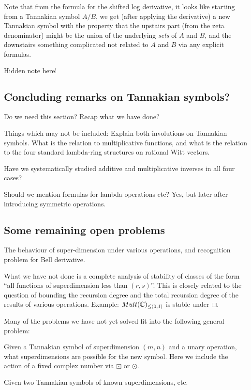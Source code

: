 Note that from the formula for the shifted log derivative, it looks like starting from a Tannakian symbol $A/B$, we get (after applying the derivative) a new Tannakian symbol with the property that the upstairs part (from the zeta denominator) might be the union of the underlying \emph{sets} of $A$ and $B$, and the downstairs something complicated not related to $A$ and $B$ via any explicit formulas. 


Hidden note here!





\subsection{Concluding remarks on Tannakian symbols?}

Do we need this section? Recap what we have done?

Things which may not be included: Explain both involutions on Tannakian symbols. What is the relation to multiplicative functions, and what is the relation to the four standard lambda-ring structures on rational Witt vectors.

Have we systematically studied additive and multiplicative inverses in all four cases?

Should we mention formulas for lambda operations etc? Yes, but later after introducing symmetric operations.


\subsection{Some remaining open problems}

The behaviour of super-dimension under various operations, and recognition problem for Bell derivative.

What we have not done is a complete analysis of stability of classes of the form ``all functions of superdimension less than $(r, s)$''. This is closely related to the question of bounding the recursion degree and the total recursion degree of the results of various operations. Example: $Mult(\mathbb{C})_{\leq (0, 1)}$ is stable under $\boxplus$.

Many of the problems we have not yet solved fit into the following general problem: 

Given a Tannakian symbol of superdimension $(m,n)$ and a unary operation, what superdimensions are possible for the new symbol. Here we include the action of a fixed complex number via $\boxdot$ or $\odot$.

Given two Tannakian symbols of known superdimensions, etc. 

